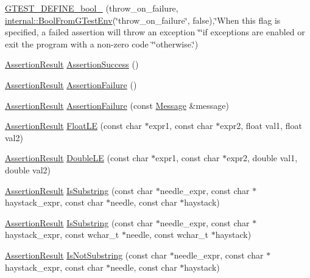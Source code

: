 \begin{DoxyCompactItemize}
\hyperlink{namespacetesting_ab114e35b616ae3f73277ddc861c90b76}{\-G\-T\-E\-S\-T\-\_\-\-D\-E\-F\-I\-N\-E\-\_\-bool\-\_\-} (throw\-\_\-on\-\_\-failure, \hyperlink{namespacetesting_1_1internal_af17bf74326e1076c47455ef2618c1a1a}{internal\-::\-Bool\-From\-G\-Test\-Env}(\char`\"{}throw\-\_\-on\-\_\-failure\char`\"{}, false),\char`\"{}\-When this flag is specified, a failed assertion will throw an exception \char`\"{}\char`\"{}if exceptions are enabled or exit the program with a non-\/zero code \char`\"{}\char`\"{}otherwise.\char`\"{})
\item 
\hyperlink{classtesting_1_1AssertionResult}{\-Assertion\-Result} \hyperlink{namespacetesting_a6941f23b3ce400dec4d2388cb466271c}{\-Assertion\-Success} ()
\item 
\hyperlink{classtesting_1_1AssertionResult}{\-Assertion\-Result} \hyperlink{namespacetesting_ac0c2a038d9ae21e130904675757fd5f3}{\-Assertion\-Failure} ()
\item 
\hyperlink{classtesting_1_1AssertionResult}{\-Assertion\-Result} \hyperlink{namespacetesting_a94c431f935a5149cafc9872ac0e711a9}{\-Assertion\-Failure} (const \hyperlink{classtesting_1_1Message}{\-Message} \&message)
\item 
\hyperlink{classtesting_1_1AssertionResult}{\-Assertion\-Result} \hyperlink{namespacetesting_a23a2d15c37bf756a5baf67922ad35172}{\-Float\-L\-E} (const char $\ast$expr1, const char $\ast$expr2, float val1, float val2)
\item 
\hyperlink{classtesting_1_1AssertionResult}{\-Assertion\-Result} \hyperlink{namespacetesting_aa02480b781912f18f8b22ab91a905d58}{\-Double\-L\-E} (const char $\ast$expr1, const char $\ast$expr2, double val1, double val2)
\item 
\hyperlink{classtesting_1_1AssertionResult}{\-Assertion\-Result} \hyperlink{namespacetesting_aa47c8fed5266f284499c1c82dd0e167e}{\-Is\-Substring} (const char $\ast$needle\-\_\-expr, const char $\ast$haystack\-\_\-expr, const char $\ast$needle, const char $\ast$haystack)
\item 
\hyperlink{classtesting_1_1AssertionResult}{\-Assertion\-Result} \hyperlink{namespacetesting_a9b82c8fa11b142a504c9d30fa3ed3ccb}{\-Is\-Substring} (const char $\ast$needle\-\_\-expr, const char $\ast$haystack\-\_\-expr, const wchar\-\_\-t $\ast$needle, const wchar\-\_\-t $\ast$haystack)
\item 
\hyperlink{classtesting_1_1AssertionResult}{\-Assertion\-Result} \hyperlink{namespacetesting_aeb4296c0ab6b8b4bb90dd7b28369f601}{\-Is\-Not\-Substring} (const char $\ast$needle\-\_\-expr, const char $\ast$haystack\-\_\-expr, const char $\ast$needle, const char $\ast$haystack)

\end{DoxyCompactItemize}
